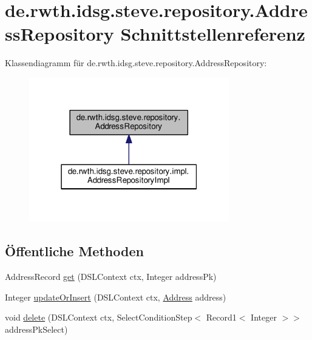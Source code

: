 \hypertarget{interfacede_1_1rwth_1_1idsg_1_1steve_1_1repository_1_1_address_repository}{\section{de.\+rwth.\+idsg.\+steve.\+repository.\+Address\+Repository Schnittstellenreferenz}
\label{interfacede_1_1rwth_1_1idsg_1_1steve_1_1repository_1_1_address_repository}
}


Klassendiagramm für de.\+rwth.\+idsg.\+steve.\+repository.\+Address\+Repository\+:\nopagebreak
\begin{figure}[H]
\begin{center}
\leavevmode
\includegraphics[width=247pt]{interfacede_1_1rwth_1_1idsg_1_1steve_1_1repository_1_1_address_repository__inherit__graph}
\end{center}
\end{figure}
\subsection*{Öffentliche Methoden}
\begin{DoxyCompactItemize}
\item 
Address\+Record \hyperlink{interfacede_1_1rwth_1_1idsg_1_1steve_1_1repository_1_1_address_repository_acc5c330b5125ff03b0a235d5a11c7df1}{get} (D\+S\+L\+Context ctx, Integer address\+Pk)
\item 
Integer \hyperlink{interfacede_1_1rwth_1_1idsg_1_1steve_1_1repository_1_1_address_repository_a35873a3790f0f03326015bb90a64a5f8}{update\+Or\+Insert} (D\+S\+L\+Context ctx, \hyperlink{classde_1_1rwth_1_1idsg_1_1steve_1_1web_1_1dto_1_1_address}{Address} address)
\item 
void \hyperlink{interfacede_1_1rwth_1_1idsg_1_1steve_1_1repository_1_1_address_repository_ac5969057336e8053dc8cdf378e804981}{delete} (D\+S\+L\+Context ctx, Select\+Condition\+Step$<$ Record1$<$ Integer $>$$>$ address\+Pk\+Select)
\end{DoxyCompactItemize}


